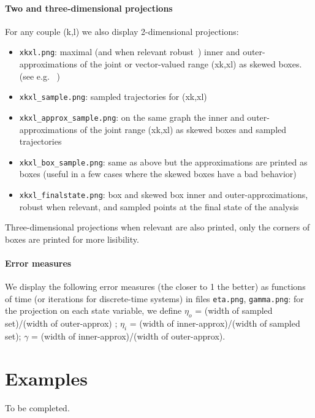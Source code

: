 \documentclass{article}
\begin{document}
\paragraph{Two and three-dimensional projections}
For any couple (k,l) we also display 2-dimensional projections:
\begin{itemize}[noitemsep]
\item \texttt{xkxl.png}:  maximal (and when relevant robust~\cite{hscc19}) inner and outer-approximations of the joint or vector-valued range (xk,xl) as skewed boxes. (see e.g. ~\cite{lcss2020})
\item \texttt{xkxl\_sample.png}: sampled trajectories for (xk,xl) 
\item \texttt{xkxl\_approx\_sample.png}: on the same graph the inner and outer-approximations of the joint range (xk,xl) as skewed boxes and sampled trajectories
\item \texttt{xkxl\_box\_sample.png}: same as above but the approximations are printed as boxes (useful in a few cases where the skewed boxes have a bad behavior)
\item \texttt{xkxl\_finalstate.png}: box and skewed box inner and outer-approximations, robust when relevant, and sampled points at the final state of the analysis
\end{itemize}
Three-dimensional projections when relevant are also printed, only the corners of boxes are printed for more lisibility.

\paragraph{Error measures}
We display the following error measures (the closer to 1 the better) as functions of time (or iterations for discrete-time systems) in files \texttt{eta.png},  \texttt{gamma.png}: for the projection on each state variable, we define $\eta_o$ = (width of sampled set)/(width of outer-approx) ; $\eta_i$ = (width of inner-approx)/(width of sampled set);
$\gamma$ = (width of inner-approx)/(width of outer-approx).




\section{Examples \label{examples}}

To be completed. 
\end{document}
